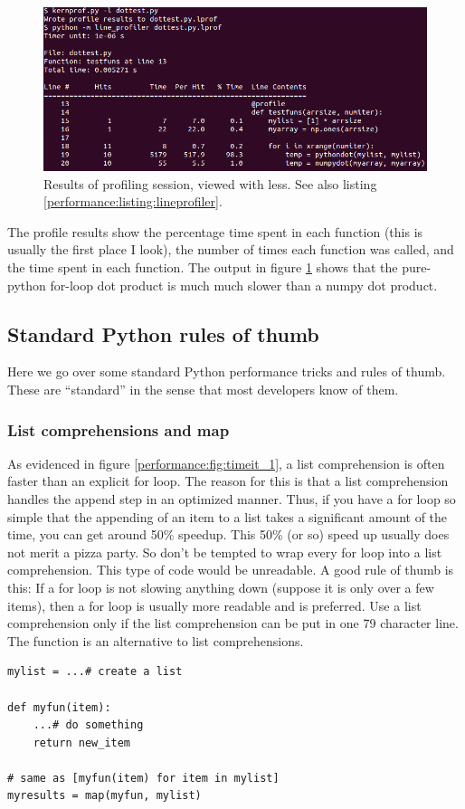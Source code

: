 \begin{figure}
  \includegraphics[width=\textwidth]{../images/dottest_profile}
  \caption{Results of profiling session, viewed with less.  See also listing \ref{performance:listing:lineprofiler}.}
  \label{performance:fig:lineprofiler}
\end{figure}
The profile results show the percentage time spent in each function (this is usually the first place I look), the number of times each function was called, and the time spent in each function.  The output in figure \ref{performance:fig:lineprofiler} shows that the pure-python for-loop dot product is much much slower than a numpy dot product.

\subsection{Standard Python rules of thumb}
\label{performance:subsection:rulesofthumb}
Here we go over some standard Python performance tricks and rules of thumb.  These are ``standard'' in the sense that most developers know of them.

\subsubsection{List comprehensions and map}
As evidenced in figure \ref{performance:fig:timeit_1}, a list comprehension is often faster than an explicit for loop.  The reason for this is that a list comprehension handles the append step in an optimized manner.  Thus, if you have a for loop so simple that the appending of an item to a list takes a significant amount of the time, you can get around 50\% speedup.  This 50\% (or so) speed up usually does not merit a pizza party.  So don't be tempted to wrap every for loop into a list comprehension.  This type of code would be unreadable.  A good rule of thumb is this:  If a for loop is not slowing anything down (suppose it is only over a few items), then a for loop is usually more readable and is preferred.  Use a list comprehension only if the list comprehension can be put in one 79 character line.  The  function is an alternative to list comprehensions.
\begin{verbatim}
mylist = ...# create a list

def myfun(item):
    ...# do something
    return new_item

# same as [myfun(item) for item in mylist]
myresults = map(myfun, mylist)
\end{verbatim}

